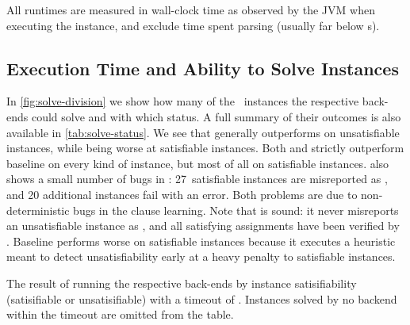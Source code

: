 \documentclass[acmsmall,review,anonymous,screen]{acmart}\settopmatter{printfolios=true,printccs=false,printacmref=true}
\theoremstyle{definition}
\begin{document}
All runtimes are measured in wall-clock time as observed by the JVM when
executing the instance, and exclude time spent parsing (usually far below
s).

\subsection{Execution Time and Ability to Solve Instances}\label{sec:runtime}

In \cref{fig:solve-division} we show how many of the~\NrBenchmarks{} instances
the respective back-ends could solve and with which status. A full summary of
their outcomes is also available in \cref{tab:solve-status}. We see that
\Calculus{} generally outperforms \Nuxmv{} on unsatisfiable instances, while
being worse at satisfiable instances. Both \Nuxmv{} and \Calculus{} strictly
outperform baseline on every kind of instance, but most of all on satisfiable
instances.  also shows a small number of bugs in
\Calculus{}: 27~satisfiable instances are misreported as \Unsat{}, and 20
additional instances fail with an error. Both problems are due to
non-deterministic bugs in the clause learning. Note that \Calculus{} is sound:
it never misreports an unsatisfiable instance as \Sat{}, and all
 satisfying assignments have been verified by \Nuxmv{}.
Baseline performs worse on satisfiable instances because it executes a heuristic
meant to detect unsatisfiability early at a heavy penalty to satisfiable
instances.

\begin{table}
  \centering
  
  \caption{The result of running the respective back-ends by instance
  satisifiability (satisifiable or unsatisifiable) with a timeout of
  \RuntimeTimeout. Instances solved by no backend within the timeout are omitted
  from the table. }\label{tab:solve-status}
\end{table}
\end{document}
